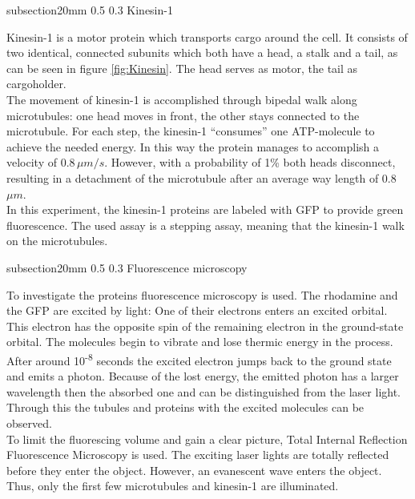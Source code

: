 \documentclass[english, %
parskip=full, %
bibliography=totoc, %
]{scrartcl}
\makeatletter
\renewcommand\subsection{\@startsection 
   {subsection}{2}{0mm}%
   {0.5\baselineskip}%
   {0.3\baselineskip}%
   {\bfseries\sffamily\large}%
   }
\makeatother
\begin{document}
\subsection{Kinesin-1}

Kinesin-1 is a motor protein which transports cargo around the cell. It consists of two identical, connected subunits which both have a head, a stalk and a tail, as can be seen in figure \ref{fig:Kinesin}. The head serves as motor, the tail as cargoholder. \\
The movement of kinesin-1 is accomplished through bipedal walk along microtubules: one head moves in front, the other stays connected to the microtubule. For each step, the kinesin-1 “consumes” one ATP-molecule to achieve the needed energy. In this way the protein manages to accomplish a velocity of 0.8\,$\mu m/s$. However, with a probability of 1\% both heads disconnect, resulting in a detachment of the microtubule after an average way length of 0.8\,$\mu m$.\\
In this experiment, the kinesin-1 proteins are labeled with GFP to provide green fluorescence. The used assay is a stepping assay, meaning that the kinesin-1 walk on the microtubules.

\subsection{Fluorescence microscopy}

To investigate the proteins fluorescence microscopy is used. The rhodamine and the GFP are excited by light: One of their electrons enters an excited orbital. This electron has the opposite spin of the remaining electron in the ground-state orbital. The molecules begin to vibrate and lose thermic energy in the process. After around 10\textsuperscript{-8} seconds the excited electron jumps back to the ground state and emits a photon. Because of the lost energy, the emitted photon has a larger wavelength then the absorbed one and can be distinguished from the laser light. Through this the tubules and proteins with the excited molecules can be observed.\\
To limit the fluorescing volume and gain a clear picture, Total Internal Reflection Fluorescence Microscopy is used. The exciting laser lights are totally reflected before they enter the object. However, an evanescent wave enters the object. Thus, only the first few microtubules and kinesin-1 are illuminated.
\end{document}
